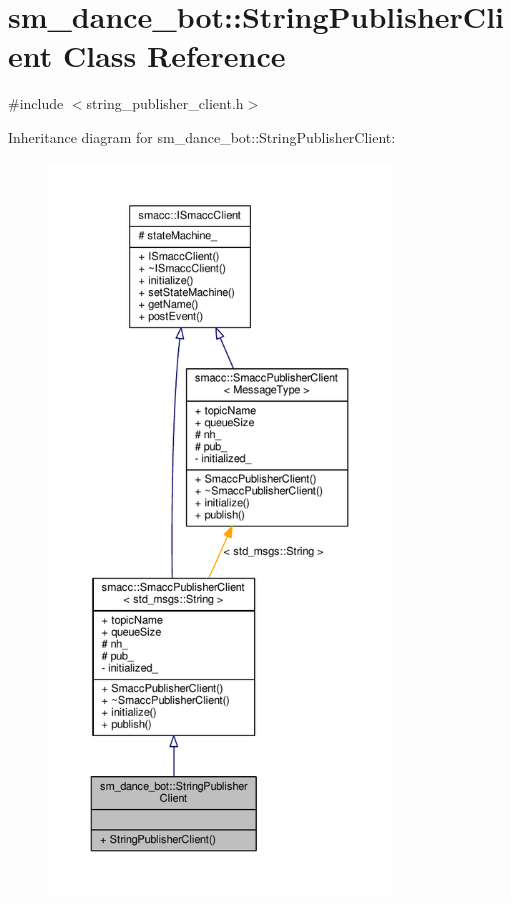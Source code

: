 \hypertarget{classsm__dance__bot_1_1StringPublisherClient}{}\section{sm\+\_\+dance\+\_\+bot\+:\+:String\+Publisher\+Client Class Reference}
\label{classsm__dance__bot_1_1StringPublisherClient}


{\ttfamily \#include $<$string\+\_\+publisher\+\_\+client.\+h$>$}



Inheritance diagram for sm\+\_\+dance\+\_\+bot\+:\+:String\+Publisher\+Client\+:
\nopagebreak
\begin{figure}[H]
\begin{center}
\leavevmode
\includegraphics[height=550pt]{classsm__dance__bot_1_1StringPublisherClient__inherit__graph}
\end{center}
\end{figure}


